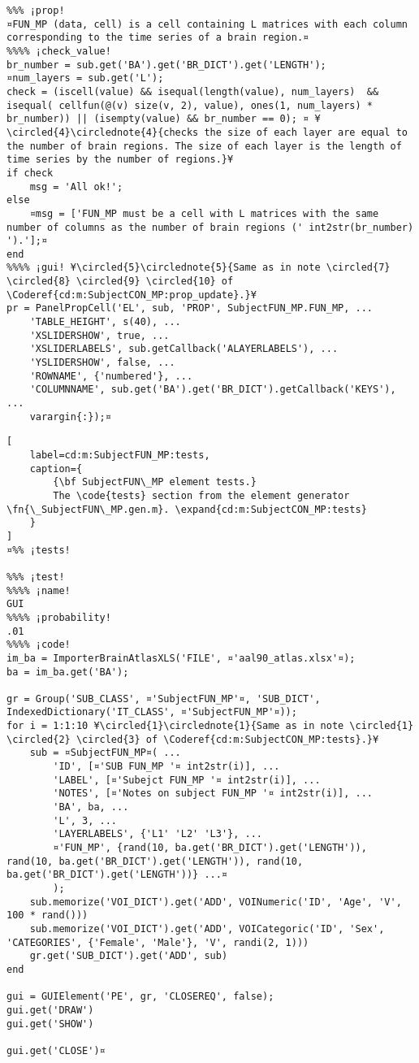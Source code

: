 \documentclass{tufte-handout}
\begin{document}
\begin{lstlisting}
%%% ¡prop!
¤FUN_MP (data, cell) is a cell containing L matrices with each column corresponding to the time series of a brain region.¤
%%%% ¡check_value!
br_number = sub.get('BA').get('BR_DICT').get('LENGTH');
¤num_layers = sub.get('L');
check = (iscell(value) && isequal(length(value), num_layers)  && isequal( cellfun(@(v) size(v, 2), value), ones(1, num_layers) * br_number)) || (isempty(value) && br_number == 0); ¤ ¥\circled{4}\circlednote{4}{checks the size of each layer are equal to the number of brain regions. The size of each layer is the length of time series by the number of regions.}¥
if check
    msg = 'All ok!';
else   
    ¤msg = ['FUN_MP must be a cell with L matrices with the same number of columns as the number of brain regions (' int2str(br_number) ').'];¤
end
%%%% ¡gui! ¥\circled{5}\circlednote{5}{Same as in note \circled{7} \circled{8} \circled{9} \circled{10} of \Coderef{cd:m:SubjectCON_MP:prop_update}.}¥
pr = PanelPropCell('EL', sub, 'PROP', SubjectFUN_MP.FUN_MP, ...
    'TABLE_HEIGHT', s(40), ...
    'XSLIDERSHOW', true, ...
    'XSLIDERLABELS', sub.getCallback('ALAYERLABELS'), ...
    'YSLIDERSHOW', false, ...
    'ROWNAME', {'numbered'}, ...
    'COLUMNNAME', sub.get('BA').get('BR_DICT').getCallback('KEYS'), ...
    varargin{:});¤

\end{lstlisting}

\begin{lstlisting}[
	label=cd:m:SubjectFUN_MP:tests,
	caption={
		{\bf SubjectFUN\_MP element tests.}
		The \code{tests} section from the element generator \fn{\_SubjectFUN\_MP.gen.m}. \expand{cd:m:SubjectCON_MP:tests}
	}
]
¤%% ¡tests!

%%% ¡test!
%%%% ¡name!
GUI
%%%% ¡probability!
.01
%%%% ¡code!
im_ba = ImporterBrainAtlasXLS('FILE', ¤'aal90_atlas.xlsx'¤);
ba = im_ba.get('BA');

gr = Group('SUB_CLASS', ¤'SubjectFUN_MP'¤, 'SUB_DICT', IndexedDictionary('IT_CLASS', ¤'SubjectFUN_MP'¤));
for i = 1:1:10 ¥\circled{1}\circlednote{1}{Same as in note \circled{1} \circled{2} \circled{3} of \Coderef{cd:m:SubjectCON_MP:tests}.}¥
    sub = ¤SubjectFUN_MP¤( ...
        'ID', [¤'SUB FUN_MP '¤ int2str(i)], ...
        'LABEL', [¤'Subejct FUN_MP '¤ int2str(i)], ...
        'NOTES', [¤'Notes on subject FUN_MP '¤ int2str(i)], ...
        'BA', ba, ...
        'L', 3, ...
        'LAYERLABELS', {'L1' 'L2' 'L3'}, ...
        ¤'FUN_MP', {rand(10, ba.get('BR_DICT').get('LENGTH')), rand(10, ba.get('BR_DICT').get('LENGTH')), rand(10, ba.get('BR_DICT').get('LENGTH'))} ...¤
        );
    sub.memorize('VOI_DICT').get('ADD', VOINumeric('ID', 'Age', 'V', 100 * rand()))
    sub.memorize('VOI_DICT').get('ADD', VOICategoric('ID', 'Sex', 'CATEGORIES', {'Female', 'Male'}, 'V', randi(2, 1)))
    gr.get('SUB_DICT').get('ADD', sub)
end

gui = GUIElement('PE', gr, 'CLOSEREQ', false);
gui.get('DRAW')
gui.get('SHOW')

gui.get('CLOSE')¤
\end{lstlisting}
\end{document}

